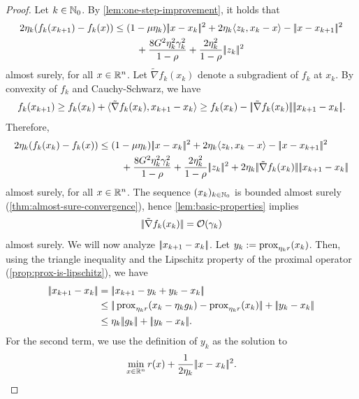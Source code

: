 \begin{proof}
    Let $k\in\mathbb{N}_0$.
    By \cref{lem:one-step-improvement}, it holds that
    \begin{align}
        2\eta_k(f_k(x_{k+1}) - f_k(x))
        &\leq ( 1 - \mu\eta_k ) |\!|x - x_k|\!|^2 + 2\eta_k\langle z_k, x_k - x \rangle 
            - |\!|x - x_{k+1}|\!|^2 \notag \\
        &\phantom{===} +  \frac{8 G^2\eta_k^2\gamma_k^2}{1 - \rho} + \frac{2\eta_k^2}{1 - \rho}|\!|z_k|\!|^2
    \end{align}
    almost surely, for all $x\in\mathbb{R}^n$.
    Let $\tilde{\nabla} f_k(x_k)$ denote a subgradient
    of $f_k$ at $x_k$. By convexity of $f_k$ and Cauchy-Schwarz, we have
    \[
        f_k(x_{k+1})
        \geq
        f_k(x_k) + \langle \tilde{\nabla} f_k(x_k), x_{k+1} - x_k \rangle
        \geq
        f_k(x_k) - |\!|\tilde{\nabla} f_k(x_k)|\!| |\!|x_{k+1} - x_k|\!|.
    \]
    Therefore,
    \begin{align}
        \label{eq:proof:lem:functional-upper-bound}
        2\eta_k(f_k(x_k) - f_k(x))
        &\leq ( 1 - \mu\eta_k ) \norm{x - x_k}^2 + 2\eta_k\langle z_k, x_k - x \rangle 
            - \norm{x - x_{k+1}}^2 \notag \\
        &\phantom{===} + \frac{8 G^2\eta_k^2\gamma_k^2}{1 - \rho}
            + \frac{2\eta_k^2}{1 - \rho}\norm{z_k}^2 + 2\eta_k \norm{\tilde{\nabla} f_k(x_k)}\norm{x_{k+1} - x_k}
    \end{align}
    almost surely, for all $x\in\mathbb{R}^n$.
    The sequence $(x_k)_{k\in\mathbb{N}_0}$ is bounded almost surely (\cref{thm:almost-sure-convergence}),
    hence \cref{lem:basic-properties} implies
    \[
        |\!|\tilde{\nabla} f_k(x_k)|\!| = \mathcal{O}(\gamma_k)
    \]
    almost surely.
    We will now analyze $|\!|x_{k+1} - x_k|\!|$. Let $y_k := \operatorname{prox}_{\eta_k r} (x_k)$. Then, using
    the triangle inequality and the Lipschitz property of the proximal operator (\cref{prop:prox-is-lipschitz}),
    we have
    \begin{align*}
        \norm{x_{k+1} - x_k} &= \norm{x_{k+1} - y_k + y_k - x_k} \\
                            &\leq \norm{\prox_{\eta_k r}(x_k - \eta_k g_k) - \prox_{\eta_k r}(x_k)} + \norm{y_k - x_k} \\
                            &\leq \eta_k \norm{g_k} + \norm{y_k - x_k}.
    \end{align*}
    For the second term, we use the definition
    of $y_k$ as the solution to
    \[
        \min_{x\in\mathbb{R}^n} r(x) + \frac{1}{2\eta_k} |\!|x - x_k|\!|^2.
\]
\end{proof}
